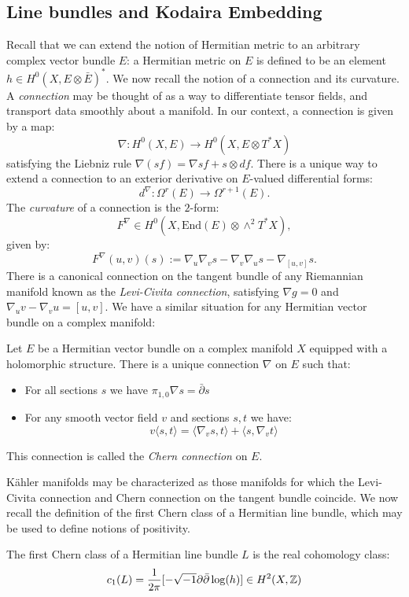 \subsection{Line bundles and Kodaira Embedding}
Recall that we can extend the notion of Hermitian metric to an arbitrary complex vector bundle \(E\): a Hermitian metric on \(E\) is defined to be an element \(h \in H^0(X, E \otimes \bar{E})^* \). We now recall the notion of a connection and its curvature. A \textit{connection} may be thought of as a way to differentiate tensor fields, and transport data smoothly about a manifold. In our context,  a connection is given by a map:
\[
\nabla: H^0(X,E) \to H^0(X,E \otimes T^* X)
\]
satisfying the Liebniz rule \(\nabla(s f) = \nabla s f + s \otimes df\). There is a unique way to extend a connection to an exterior derivative on \(E\)-valued differential forms:
\[
d^\nabla: \Omega^r(E) \to \Omega^{r+1}(E).
\]
The \textit{curvature} of a connection is the \(2\)-form:
\[
F^\nabla \in H^0(X, \text{End}(E) \otimes \wedge^2 T^* X),
\]
given by:
\[
F^\nabla(u,v)(s) := \nabla_u \nabla_v s - \nabla_v \nabla_u s - \nabla_{[u,v]} s.
\]
There is a canonical connection on the tangent bundle of any Riemannian manifold known as the \textit{Levi-Civita connection}, satisfying \(\nabla g = 0\) and \(\nabla_u v - \nabla_v u = [u,v]\). We have a similar situation for any Hermitian vector bundle on a complex manifold:	
\begin{example}
Let \(E\) be a Hermitian vector bundle on a complex manifold \(X\) equipped with a holomorphic structure. There is a unique connection \(\nabla\) on \(E\) such that:
\begin{itemize}
\item For all sections \(s\) we have \(\pi_{1,0} \nabla s = \bar{\partial} s\)
\item For any smooth vector field \(v\) and sections \(s,t\) we have:
\[
v \langle s,t \rangle = \langle \nabla_v s , t \rangle + \langle s, \nabla_v t \rangle
\] 
\end{itemize}
This connection is called the \textit{Chern connection} on \(E\).
\end{example}
K\"ahler manifolds may be characterized as those manifolds for which the Levi-Civita connection and Chern connection on the tangent bundle coincide. We now recall the definition of the first Chern class of a Hermitian line bundle, which may be used to define notions of positivity.
\begin{definition}
The first Chern class of a Hermitian line bundle \(L\) is the real cohomology class:
\[
c_1(L) = \frac{1}{2 \pi} [  - \sqrt{-1} \partial \bar{\partial} \log(h) ] \in H^2(X, \mathbb{Z})
\]
\end{definition}

